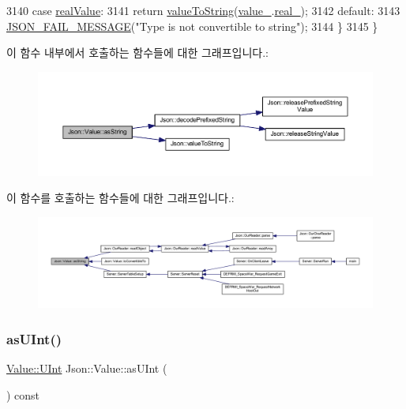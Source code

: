 \begin{DoxyCode}
3140   \textcolor{keywordflow}{case} \hyperlink{namespace_json_a7d654b75c16a57007925868e38212b4eab837c7b869c14d8be712deb45c9e490e}{realValue}:
3141     \textcolor{keywordflow}{return} \hyperlink{namespace_json_a498503e8f49d6a3811e3c9f6757da60d}{valueToString}(\hyperlink{class_json_1_1_value_aef578244546212705b9f81eb84d7e151}{value\_}.\hyperlink{union_json_1_1_value_1_1_value_holder_af0c5ca724e5fe3a15db773d750e2351e}{real\_});
3142   \textcolor{keywordflow}{default}:
3143     \hyperlink{json_8h_a67007439f94bc6afc465923f56147ba1}{JSON\_FAIL\_MESSAGE}(\textcolor{stringliteral}{"Type is not convertible to string"});
3144   \}
3145 \}
\end{DoxyCode}
이 함수 내부에서 호출하는 함수들에 대한 그래프입니다.\+:\nopagebreak
\begin{figure}[H]
\begin{center}
\leavevmode
\includegraphics[width=350pt]{class_json_1_1_value_ae3f9b0d38f820ccdd8888aa92ea6e792_cgraph}
\end{center}
\end{figure}
이 함수를 호출하는 함수들에 대한 그래프입니다.\+:\nopagebreak
\begin{figure}[H]
\begin{center}
\leavevmode
\includegraphics[width=350pt]{class_json_1_1_value_ae3f9b0d38f820ccdd8888aa92ea6e792_icgraph}
\end{center}
\end{figure}
\mbox{\label{class_json_1_1_value_a74b305583ec3aacf4f9dd06e799dc265}} 
\subsubsection{\texorpdfstring{as\+U\+Int()}{asUInt()}}
{\footnotesize\ttfamily \hyperlink{class_json_1_1_value_a0933d59b45793ae4aade1757c322a98d}{Value\+::\+U\+Int} Json\+::\+Value\+::as\+U\+Int (\begin{DoxyParamCaption}{ }\end{DoxyParamCaption}) const}



